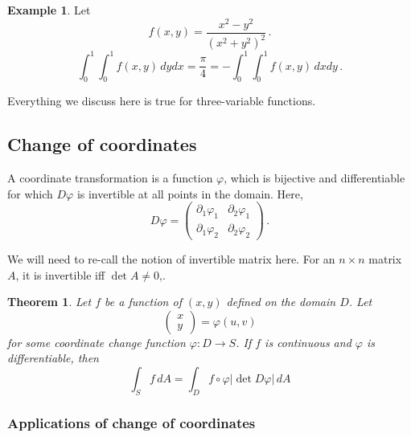 \documentclass[
]{article}
\newtheorem{theorem}{Theorem}[section]
\theoremstyle{definition}
\theoremstyle{definition}
\newtheorem{example}{Example}[section]
\theoremstyle{definition}
\theoremstyle{definition}
\theoremstyle{remark}
\begin{document}
\begin{example}
Let
\begin{equation*}
    f(x,y) =  \frac{x^2 - y^2}{(x^2 + y^2)^2} \,.
\end{equation*}
\begin{equation*}
    \int_0^1\int_0^1 f(x,y) \,dy dx = \frac{\pi}{4} = - \int_0^1\int_0^1 f(x,y) \, dx dy \,.
\end{equation*}
\end{example}

Everything we discuss here is true for three-variable functions.

\hypertarget{change-of-coordinates}{%
\subsection{Change of coordinates}\label{change-of-coordinates}}

A coordinate transformation is a function \(\varphi\), which
is bijective and differentiable for which \(D\varphi\) is
invertible at all points in the domain.
Here,
\begin{equation*}
    D\varphi = 
    \begin{pmatrix}
        \partial_1 \varphi_1 & \partial_2 \varphi_1 \\
        \partial_1 \varphi_2 & \partial_2 \varphi_2 
    \end{pmatrix} \,.
\end{equation*}

We will need to re-call the notion of invertible matrix here.
For an \(n\times n\) matrix \(A\), it is invertible iff \(\det A \not= 0\),.

\begin{theorem}
Let \(f\) be a function of \((x,y)\) defined on the domain \(D\).
Let
\begin{equation*}
    \begin{pmatrix}
        x \\ y
    \end{pmatrix}
     = \varphi(u,v)
\end{equation*}
for some coordinate change function \(\varphi: D \to S\).
If \(f\) is continuous and \(\varphi\) is differentiable, then
\begin{equation*}
    \int_S f \, dA = \int_D f\circ \varphi |\det D \varphi| \, dA
\end{equation*}
\end{theorem}

\hypertarget{applications-of-change-of-coordinates}{%
\subsubsection{Applications of change of coordinates}\label{applications-of-change-of-coordinates}}
\end{document}
